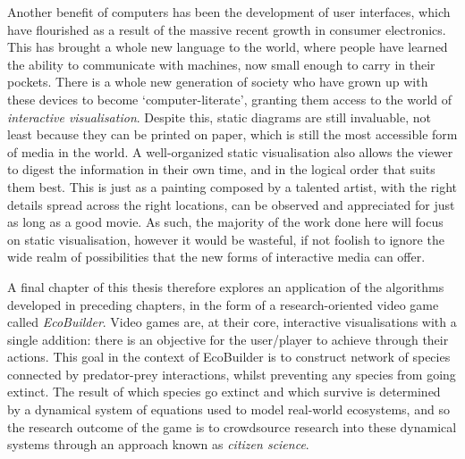 Another benefit of computers has been the development of user interfaces, which have flourished as a result of the massive recent growth in consumer electronics. This has brought a whole new language to the world, where people have learned the ability to communicate with machines, now small enough to carry in their pockets. There is a whole new generation of society who have grown up with these devices to become `computer-literate', granting them access to the world of \emph{interactive visualisation}. Despite this, static diagrams are still invaluable, not least because they can be printed on paper, which is still the most accessible form of media in the world. A well-organized static visualisation also allows the viewer to digest the information in their own time, and in the logical order that suits them best. This is just as a painting composed by a talented artist, with the right details spread across the right locations, can be observed and appreciated for just as long as a good movie.
As such, the majority of the work done here will focus on static visualisation, however it would be wasteful, if not foolish to ignore the wide realm of possibilities that the new forms of interactive media can offer.

A final chapter of this thesis therefore explores an application of the algorithms developed in preceding chapters, in the form of a research-oriented video game called \emph{EcoBuilder}. Video games are, at their core, interactive visualisations with a single addition: there is an objective for the user/player to achieve through their actions. This goal in the context of EcoBuilder is to construct network of species connected by predator-prey interactions, whilst preventing any species from going extinct. The result of which species go extinct and which survive is determined by a dynamical system of equations used to model real-world ecosystems, and so the research outcome of the game is to crowdsource research into these dynamical systems through an approach known as \emph{citizen science}.

